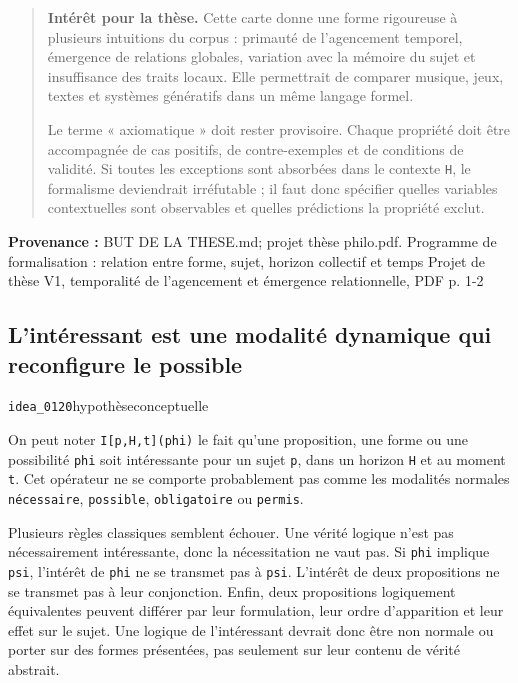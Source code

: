 \documentclass[10pt,a4paper]{article}
\begin{document}
\begin{quote}
\textbf{Intérêt pour la thèse.} Cette carte donne une forme rigoureuse à plusieurs intuitions du corpus : primauté de l'agencement temporel, émergence de relations globales, variation avec la mémoire du sujet et insuffisance des traits locaux. Elle permettrait de comparer musique, jeux, textes et systèmes génératifs dans un même langage formel.

Le terme « axiomatique » doit rester provisoire. Chaque propriété doit être accompagnée de cas positifs, de contre-exemples et de conditions de validité. Si toutes les exceptions sont absorbées dans le contexte \texttt{H}, le formalisme deviendrait irréfutable ; il faut donc spécifier quelles variables contextuelles sont observables et quelles prédictions la propriété exclut.
\end{quote}
{\footnotesize\color{metadata}\textbf{Provenance :} BUT DE LA THESE.md; projet thèse philo.pdf. Programme de formalisation : relation entre forme, sujet, horizon collectif et temps Projet de thèse V1, temporalité de l'agencement et émergence relationnelle, PDF p. 1-2\par}

\subsection{L'intéressant est une modalité dynamique qui reconfigure le possible}
{\small\color{metadata} \texttt{idea\_0120}\quad\textbullet\quad hypothèse\quad\textbullet\quad conceptuelle\par}

On peut noter \texttt{I[p,H,t](phi)} le fait qu'une proposition, une forme ou une possibilité \texttt{phi} soit intéressante pour un sujet \texttt{p}, dans un horizon \texttt{H} et au moment \texttt{t}. Cet opérateur ne se comporte probablement pas comme les modalités normales \texttt{nécessaire}, \texttt{possible}, \texttt{obligatoire} ou \texttt{permis}.

Plusieurs règles classiques semblent échouer. Une vérité logique n'est pas nécessairement intéressante, donc la nécessitation ne vaut pas. Si \texttt{phi} implique \texttt{psi}, l'intérêt de \texttt{phi} ne se transmet pas à \texttt{psi}. L'intérêt de deux propositions ne se transmet pas à leur conjonction. Enfin, deux propositions logiquement équivalentes peuvent différer par leur formulation, leur ordre d'apparition et leur effet sur le sujet. Une logique de l'intéressant devrait donc être non normale ou porter sur des formes présentées, pas seulement sur leur contenu de vérité abstrait.
\end{document}
